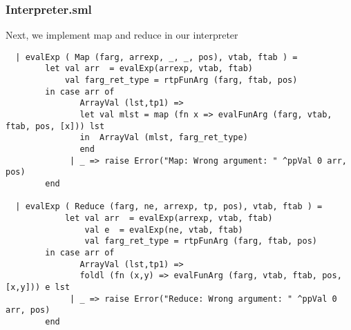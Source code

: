 \documentclass[12pt]{article}
\begin{document}
\subsubsection{Interpreter.sml}
Next, we implement map and reduce in our interpreter

\begin{verbatim}
  | evalExp ( Map (farg, arrexp, _, _, pos), vtab, ftab ) =
        let val arr  = evalExp(arrexp, vtab, ftab)
            val farg_ret_type = rtpFunArg (farg, ftab, pos)
        in case arr of
               ArrayVal (lst,tp1) =>
               let val mlst = map (fn x => evalFunArg (farg, vtab, ftab, pos, [x])) lst
               in  ArrayVal (mlst, farg_ret_type)
               end
             | _ => raise Error("Map: Wrong argument: " ^ppVal 0 arr, pos)
        end

  | evalExp ( Reduce (farg, ne, arrexp, tp, pos), vtab, ftab ) =
            let val arr  = evalExp(arrexp, vtab, ftab)
                val e  = evalExp(ne, vtab, ftab)
                val farg_ret_type = rtpFunArg (farg, ftab, pos)
        in case arr of
               ArrayVal (lst,tp1) =>
               foldl (fn (x,y) => evalFunArg (farg, vtab, ftab, pos, [x,y])) e lst
             | _ => raise Error("Reduce: Wrong argument: " ^ppVal 0 arr, pos)
        end
\end{verbatim}
\end{document}
